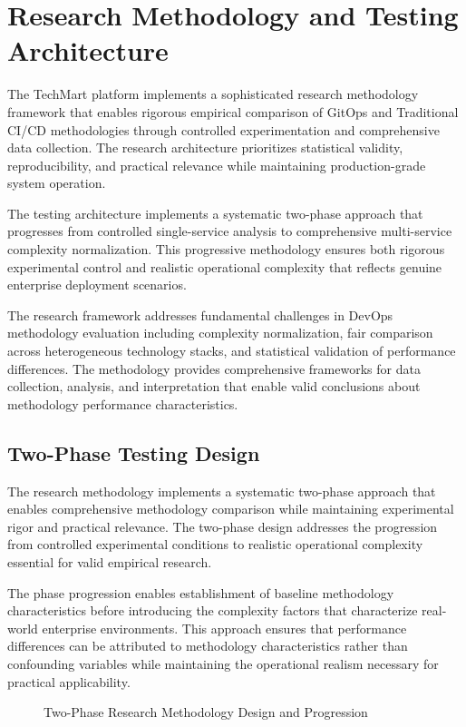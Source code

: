\section{Research Methodology and Testing Architecture}

The TechMart platform implements a sophisticated research methodology framework that enables rigorous empirical comparison of GitOps and Traditional CI/CD methodologies through controlled experimentation and comprehensive data collection. The research architecture prioritizes statistical validity, reproducibility, and practical relevance while maintaining production-grade system operation.

The testing architecture implements a systematic two-phase approach that progresses from controlled single-service analysis to comprehensive multi-service complexity normalization. This progressive methodology ensures both rigorous experimental control and realistic operational complexity that reflects genuine enterprise deployment scenarios.

The research framework addresses fundamental challenges in DevOps methodology evaluation including complexity normalization, fair comparison across heterogeneous technology stacks, and statistical validation of performance differences. The methodology provides comprehensive frameworks for data collection, analysis, and interpretation that enable valid conclusions about methodology performance characteristics.

\subsection{Two-Phase Testing Design}

The research methodology implements a systematic two-phase approach that enables comprehensive methodology comparison while maintaining experimental rigor and practical relevance. The two-phase design addresses the progression from controlled experimental conditions to realistic operational complexity essential for valid empirical research.

The phase progression enables establishment of baseline methodology characteristics before introducing the complexity factors that characterize real-world enterprise environments. This approach ensures that performance differences can be attributed to methodology characteristics rather than confounding variables while maintaining the operational realism necessary for practical applicability.

\begin{figure}[H]
\centering
\caption{Two-Phase Research Methodology Design and Progression}
\label{fig:two-phase-methodology-design}
\end{figure}

